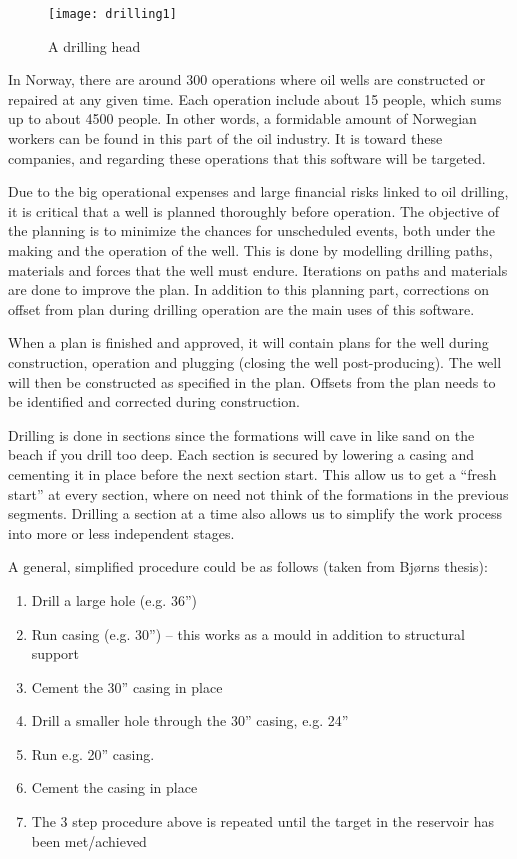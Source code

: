 \documentclass{report}
\begin{document}
\begin{wrapfigure}{R}{0.5\textwidth}
    \centering
    \texttt{[image: drilling1]}
    \caption{A drilling head \label{fig:drillinghead}}
\end{wrapfigure}

In Norway, there are around 300 operations where oil wells are constructed or repaired at any given time. Each operation include about 15 people, which sums up to about 4500 people. In other words, a formidable amount of Norwegian workers can be found in this part of the oil industry. It is toward these companies, and regarding these operations that this software will be targeted.

Due to the big operational expenses and large financial risks linked to oil drilling, it is critical that a well is planned thoroughly before operation. The objective of the planning is to minimize the chances for unscheduled events, both under the making and the operation of the well. This is done by modelling drilling paths, materials and forces that the well must endure. Iterations on paths and materials are done to improve the plan. In addition to this planning part, corrections on offset from plan during drilling operation are the main uses of this software.

When a plan is finished and approved, it will contain plans for the well during construction, operation and plugging (closing the well post-producing). The well will then be constructed as specified in the plan. Offsets from the plan needs to be identified and corrected during construction.

Drilling is done in sections since the formations will cave in like sand on the beach if you drill too deep. Each section is secured by lowering a casing and cementing it in place before the next section start. This allow us to get a “fresh start” at every section, where on need not think of the formations in the previous segments. Drilling a section at a time also allows us to simplify the work process into more or less independent stages.


A general, simplified procedure could be as follows (taken from Bjørns thesis):

\begin{enumerate}
    \item Drill a large hole (e.g. 36”)
    \item Run casing (e.g. 30”) – this works as a mould in addition to structural support
    \item Cement the 30” casing in place
    \item Drill a smaller hole through the 30” casing, e.g. 24”
    \item Run e.g. 20” casing.
    \item Cement the casing in place
    \item The 3 step procedure above is repeated until the target in the reservoir has been met/achieved
\end{enumerate}
\end{document}
